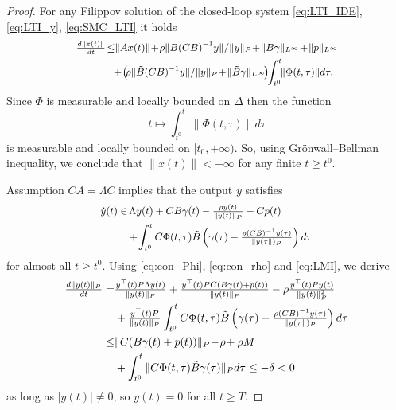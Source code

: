 \documentclass{article}
\begin{document}
\begin{proof}
	For any Filippov solution of the closed-loop system \eqref{eq:LTI_IDE}, \eqref{eq:LTI_y}, \eqref{eq:SMC_LTI} it holds\vspace{-1mm}
	\[\small
	\begin{split}
		\tfrac{d \|x(t)\|}{dt}\!\leq & \|Ax(t)\|\!+\!\rho\| B(CB)^{-1}y\|/\|y\|_{P}\!+\!\|B\gamma\|_{L^{\infty}}\!+\!\|p\|_{L^{\infty}}\!\\
		&\!\!+\!
		\left(\!\rho \| \tilde B(CB)^{-1}y\|/\|y\|_{P}\!+\!\|\tilde B\gamma\|_{L^{\infty}}\!\right)\!\!\int^t_{t^0}\!\!\|\Phi(t,\tau)\| d\tau.
	\end{split}\vspace{-1mm}
	\]
	Since $\Phi$ is measurable and  locally bounded on $\Delta$ then the function $$t\mapsto \int^t_{t^0}\|\Phi(t,\tau)\| d\tau$$ is measurable and locally bounded on $[t_0,+\infty)$. So, using Gr\"onwall--Bellman inequality, we conclude that $\|x(t)\|<+\infty$ for any finite  $t\geq t^0$.
	
	Assumption $CA=\Lambda C$ implies that the output $y$ satisfies \vspace{-1mm}
	\begin{equation}\label{eq:dyn_z_LTI}\small
		\begin{split}
			\dot y(t)\in&\,  \Lambda y(t)+CB\gamma(t)-\tfrac{\rho y(t)}{\|y(t)\|_{P}}+Cp(t)\\
			& +\!\int^t_{t^0}C\Phi(t,\tau)\tilde B
			\left( \gamma(\tau)-\tfrac{\rho (CB)^{-1} y(\tau)}{\|y(\tau\|)_{P}}\right)d
			\tau
		\end{split}\vspace{-1mm}
	\end{equation}
	for almost all $t\geq t^0$. Using \eqref{eq:con_Phi}, \eqref{eq:con_rho}  and \eqref{eq:LMI}, we derive \vspace{-1mm}
	\[
	\begin{split}
		\tfrac{d \|y(t)\|_{P}}{dt}=&\tfrac{y^{\top}(t)P\Lambda y(t)}{\|y(t)\|_{P}} +\tfrac{y^{\top}(t)PC(B\gamma(t)+p(t))}{\|y(t)\|_{P}}-\rho\tfrac{y^{\top}(t)Py(t)}{\|y(t)\|_{P}^2}\\
		&+\tfrac{y^{\top}(t)P}{\|y(t)\|_{P}}\int^t_{t^0}C\Phi(t,\tau)\tilde B
		\left( \gamma(\tau)-\tfrac{\rho (CB)^{-1} y(\tau)}{\|y(\tau\|)_{P}}\right)d
		\tau\\
		\leq &\|C(B\gamma(t)+p(t))\|_{P}\!-\!\rho \!+\rho M\\
		&+\int^t_{t^0} \|C\Phi(t,\tau)\tilde B\gamma(\tau)\|_{P} d\tau\leq-\delta<0\\
	\end{split} \vspace{-1mm}
	\]
	as long as $|y(t)|\neq 0$, so $y(t)=0$ for all $t\geq T$.
\end{proof}
\end{document}
